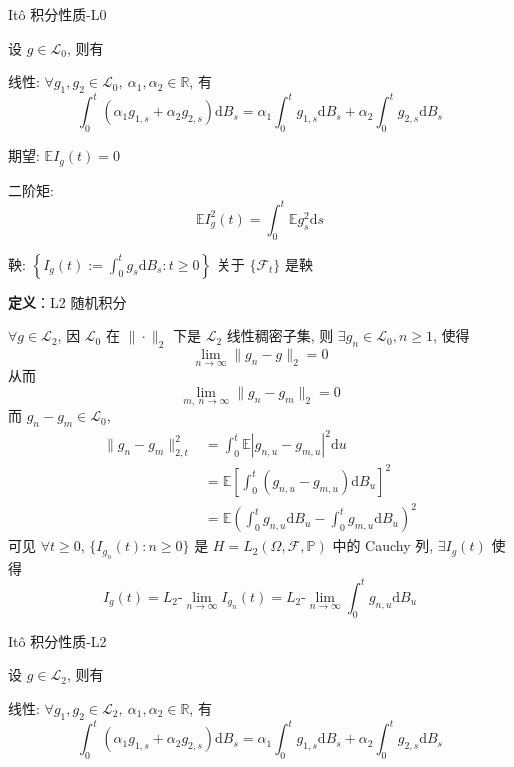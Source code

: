 \documentclass[openany]{ctexbook}
\theoremstyle{kaiti}
\theoremstyle{normal}
\begin{document}
It\^o 积分性质-L0

设 $g\in\mathcal{L}_0$, 则有

线性: $\forall g_1,g_2\in\mathcal{L}_0,~\alpha_1,\alpha_2\in\mathbb{R}$, 有
\begin{equation}
  \int_0^t(\alpha_1g_{1,s}+\alpha_2g_{2,s})\mathrm{d}B_s=\alpha_1\int_0^tg_{1,s}\mathrm{d}B_s+\alpha_2\int_0^tg_{2,s}\mathrm{d}B_s
\end{equation}

期望: $\mathbb{E}I_g(t)=0$

二阶矩:
\begin{equation}
  \mathbb{E}I_g^2(t)=\int_0^t\mathbb{E}g_s^2\mathrm{d}s
\end{equation}

鞅: $\displaystyle\left\{I_g(t):=\int_0^tg_s\mathrm{d}B_s:t\geqslant0\right\}$ 关于 $\{\mathcal{F}_t\}$ 是鞅

\textbf{定义}：L2 随机积分

$\forall g\in\mathcal{L}_2$, 因 $\mathcal{L}_0$ 在 $\|\cdot\|_2$ 下是 $\mathcal{L}_2$ 线性稠密子集, 则 $\exists g_n\in\mathcal{L}_0,n\geqslant1$, 使得
\begin{equation}
  \lim_{n\to\infty}\|g_n-g\|_2=0
\end{equation}
从而
\begin{equation}
  \lim_{m,~n\to\infty}\|g_n-g_m\|_2=0
\end{equation}
而 $g_n-g_m\in\mathcal{L}_0$, 
\begin{equation}
  \begin{aligned}
    \|g_n-g_m\|_{2,t}^2&=\int_0^t\mathbb{E}|g_{n,u}-g_{m,u}|^2\mathrm{d}u\\
    &=\mathbb{E}\left[\int_0^t(g_{n,u}-g_{m,u})\mathrm{d}B_u\right]^2\\
    &=\mathbb{E}\left(\int_0^tg_{n,u}\mathrm{d}B_u-\int_0^tg_{m,u}\mathrm{d}B_u\right)^2
  \end{aligned}
\end{equation} 可见 $\forall t\geqslant0$, $\{I_{g_n}(t):n\geqslant0\}$ 是 $H=L_2(\Omega,\mathcal{F},\mathbb{P})$ 中的 Cauchy 列, $\exists I_g(t)$ 使得
\begin{equation}
  I_g(t)=L_2\text{-}\lim_{n\to\infty}I_{g_n}(t)=L_2\text{-}\lim_{n\to\infty}\int_0^tg_{n,u}\mathrm{d}B_u
\end{equation}

It\^o 积分性质-L2

设 $g\in\mathcal{L}_2$, 则有

线性: $\forall g_1,g_2\in\mathcal{L}_2,~\alpha_1,\alpha_2\in\mathbb{R}$, 有
\begin{equation}
  \int_0^t(\alpha_1g_{1,s}+\alpha_2g_{2,s})\mathrm{d}B_s=\alpha_1\int_0^tg_{1,s}\mathrm{d}B_s+\alpha_2\int_0^tg_{2,s}\mathrm{d}B_s
\end{equation}
\end{document}

